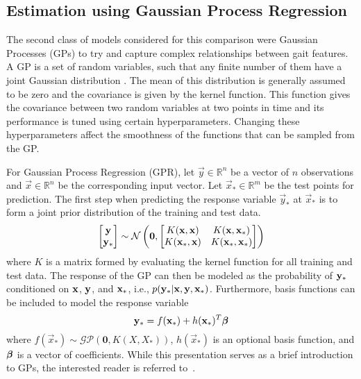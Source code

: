 \subsection{Estimation using Gaussian Process Regression}\label{sec:GPR}

The second class of models considered for this comparison were Gaussian Processes (GPs) to try and capture complex relationships between gait features. A GP is a set of random variables, such that any finite number of them have a joint Gaussian distribution \cite{rasmussen2006gaussian}. The mean of this distribution is generally assumed to be zero and the covariance is given by the kernel function. This function gives the covariance between two random variables at two points in time and its performance is tuned using certain hyperparameters. Changing these hyperparameters affect the smoothness of the functions that can be sampled from the GP.

For Gaussian Process Regression (GPR), let $ \vec{y} \in \mathbb{R}^n $ be a vector of $ n $ observations and $ \vec{x} \in \mathbb{R}^n  $ be the corresponding input vector. Let $ \vec{x}_{*} \in \mathbb{R}^m$ be the test points for prediction. The first step when predicting the response variable $ \vec{y}_{*} $ at $ \vec{x}_{*} $ is to form a joint prior distribution of the training and test data. 
\[
	\begin{bmatrix}
		\y \\
		\y_{*}
	\end{bmatrix} \sim \mathcal{N} \left(\mathbf{0},%
	\begin{bmatrix}
		K(\x,\x) & K(\x,\x_{*}) \\
		K(\x_{*},\x) & K(\x_{*},\x_{*})
	\end{bmatrix}\right)
\]
where $ K $ is a matrix formed by evaluating the kernel function for all training and test data. The response of the GP can then be modeled as the probability of $ \mathbf{y}_{*} $ conditioned on $ \mathbf{x} $, $ \mathbf{y} $, and $ \mathbf{x}_{*} $, i.e., $ p(\mathbf{y}_{*}|\mathbf{x},\mathbf{y},\mathbf{x}_{*}) $. Furthermore, basis functions can be included to model the response variable
\[
	\mathbf{y}_{*} = f(\mathbf{x}_{*}) + h(\mathbf{x}_{*})^T \boldsymbol{\beta}
\]
where $ f(\vec{x}_{*}) \sim \mathcal{GP}(\mathbf{0},K(X,X_{*})) $, $ h(\vec{x}_*) $ is an optional basis function, and $ \boldsymbol{\beta} $ is a vector of coefficients. While this presentation serves as a brief introduction to GPs, the interested reader is referred to~\cite{rasmussen2006gaussian}.

